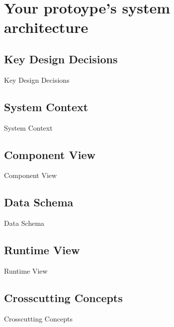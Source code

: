 \section{Your protoype’s system architecture}
\subsection{Key Design Decisions}
Key Design Decisions

\subsection{System Context}
System Context

\subsection{Component View}
Component View

\subsection{Data Schema}
Data Schema

\subsection{Runtime View}
Runtime View

\subsection{Crosscutting Concepts}
Crosscutting Concepts